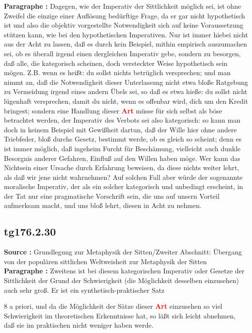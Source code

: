 \documentclass[a4paper,12pt,twoside]{book}
\newcommand{\match}[1]{\textcolor{red}{\textbf{#1}}}
\begin{document}
	\noindent\textbf{Paragraphe : }Dagegen, wie der Imperativ der Sittlichkeit möglich sei, ist ohne Zweifel die einzige einer Auflösung bedürftige Frage, da er gar nicht hypothetisch ist und also die objektiv vorgestellte Notwendigkeit sich auf keine Voraussetzung stützen kann, wie bei den hypothetischen Imperativen. Nur ist immer hiebei nicht aus der Acht zu lassen, daß es durch kein Beispiel, mithin empirisch auszumachen sei, ob es überall irgend einen dergleichen Imperativ gebe, sondern zu besorgen, daß alle, die kategorisch scheinen, doch versteckter Weise hypothetisch sein mögen. Z.B. wenn es heißt: du sollst nichts betrüglich versprechen; und man nimmt an, daß die Notwendigkeit dieser Unterlassung nicht etwa bloße Ratgebung zu Vermeidung irgend eines andern Übels sei, so daß es etwa hieße: du sollst nicht lügenhaft versprechen, damit du nicht, wenn es offenbar wird, dich um den Kredit bringest; sondern eine Handlung dieser \match{Art} müsse für sich selbst als böse betrachtet werden, der Imperativ des Verbots sei also kategorisch: so kann man doch in keinem Beispiel mit Gewißheit dartun, daß der Wille hier ohne andere Triebfeder, bloß durchs Gesetz, bestimmt werde, ob es gleich so scheint; denn es ist immer möglich, daß ingeheim Furcht für Beschämung, vielleicht auch dunkle Besorgnis anderer Gefahren, Einfluß auf den Willen haben möge. Wer kann das Nichtsein einer Ursache durch Erfahrung beweisen, da diese nichts weiter lehrt, als daß wir jene nicht wahrnehmen? Auf solchen Fall aber würde der sogenannte moralische Imperativ, der als ein solcher kategorisch und unbedingt erscheint, in der Tat nur eine pragmatische Vorschrift sein, die uns auf unsern Vorteil aufmerksam macht, und uns bloß lehrt, diesen in Acht zu nehmen. 
	
	\subsection*{tg176.2.30} 
	\textbf{Source : }Grundlegung zur Metaphysik der Sitten/Zweiter Abschnitt: Übergang von der populären sittlichen Weltweisheit zur Metaphysik der Sitten\\  
	
	\noindent\textbf{Paragraphe : }Zweitens ist bei diesem kategorischen Imperativ oder Gesetze der Sittlichkeit der Grund der Schwierigkeit (die Möglichkeit desselben einzusehen) auch sehr groß. Er ist ein synthetisch-praktischer Satz
	
	
	8
	a priori, und da die Möglichkeit der Sätze dieser \match{Art} einzusehen so viel Schwierigkeit im theoretischen Erkenntnisse hat, so läßt sich leicht abnehmen, daß sie im praktischen nicht weniger haben werde. 
	
\end{document}
